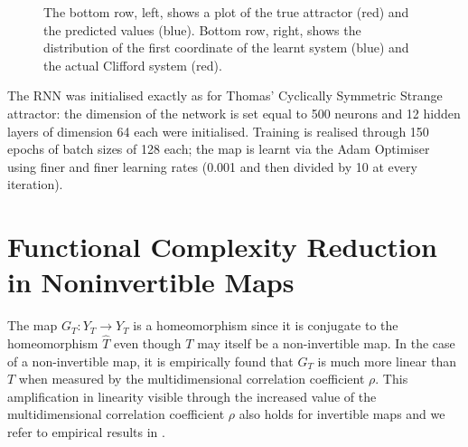 \begin{figure}[ht]
  \endminipage
  \caption{The bottom row, left, shows a plot of the true attractor (red) and the predicted values (blue). Bottom row, right, shows the distribution of the first coordinate of the learnt system (blue) and the actual Clifford system (red). }
  \label{fig:Clifford}
\end{figure}

 The RNN was initialised exactly as for Thomas' Cyclically Symmetric Strange attractor: the dimension of the network is set equal to 500 neurons and 12 hidden layers of dimension 64 each were initialised. Training is realised through 150 epochs of batch sizes of 128 each; the map is learnt via the Adam Optimiser using finer and finer learning rates (0.001 and then divided by 10 at every iteration).

\section{Functional Complexity Reduction in Noninvertible Maps}
The map $G_T : Y_T \to Y_T$ is a homeomorphism since it is conjugate to the homeomorphism $\widehat{T}$ even though $T$ may itself be a non-invertible map. In the case of a non-invertible map, it is empirically found that $G_T$ is much more linear than $T$ when measured by the multidimensional correlation coefficient $\rho$. This amplification in linearity visible through the increased value of the multidimensional correlation coefficient $\rho$  also holds for invertible maps and we refer to empirical results in \cite{Supp}. 

